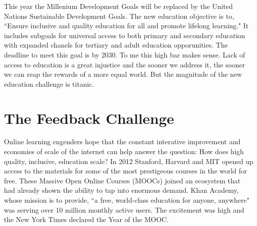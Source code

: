 
This year the Millenium Development Goals will be replaced by the United Nations Sustainable Development Goals. The new education objective is to, ``Ensure inclusive and quality education for all and promote lifelong learning." It includes subgoals for universal access to both primary and secondary education with expanded chanels for tertiary and adult education opporunities. The deadline to meet this goal is by 2030. To me this high bar makes sense. Lack of access to education is a great injustice and the sooner we address it, the sooner we can reap the rewards of a more equal world. But the magnitude of the new education challenge is titanic.

\section{The Feedback Challenge}

Online learning engenders hope that the constant interative improvement and economies of scale of the internet can help answer the question: How does high quality, inclusive, education scale? In 2012 Stanford, Harvard and MIT opened up access to the materials for some of the most prestigeous courses in the world for free. These Massive Open Online Courses (MOOCs) joined an ecosystem that had already shown the ability to tap into enormous demand. Khan Academy, whose mission is to provide, ``a free, world-class education for anyone, anywhere" was serving over 10 million monthly active users. The excitement was high and the New York Times declared the Year of the MOOC.

